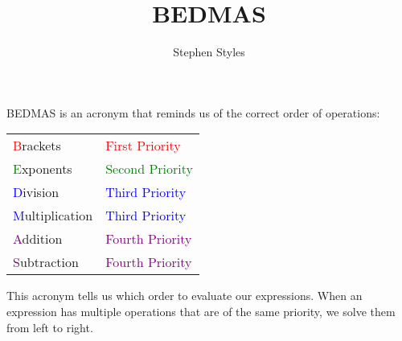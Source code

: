 \documentclass[16pt]{article}
\title{BEDMAS}
\author{Stephen Styles}
\theoremstyle{remark}
\begin{document}
\maketitle
BEDMAS is an acronym that reminds us of the correct order of operations:\\
\begin{center}
\begin{tabular}{ l l }
 \textcolor{red}{B}rackets & \textcolor{red}{First Priority}  \\ 
 \textcolor{green}{E}xponents & \textcolor{green}{Second Priority } \\  
 \textcolor{blue}{D}ivision & \textcolor{blue}{Third Priority}  \\
 \textcolor{blue}{M}ultiplication & \textcolor{blue}{Third Priority}\\
 \textcolor{purple}{A}ddition & \textcolor{purple}{Fourth Priority}\\
 \textcolor{purple}{S}ubtraction & \textcolor{purple}{Fourth Priority}\\    
\end{tabular}
\end{center}
This acronym tells us which order to evaluate our expressions. When an expression has multiple operations that are of the same priority, we solve them from left to right.\\
\end{document}
